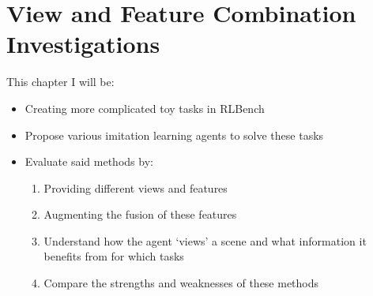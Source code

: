 \chapter{View and Feature Combination Investigations}\label{ch:view-comb}
This chapter I will be:
\begin{itemize}
  \item Creating more complicated toy tasks in RLBench
  \item Propose various imitation learning agents to solve these tasks
  \item Evaluate said methods by:
  \begin{enumerate}
    \item Providing different views and features
    \item Augmenting the fusion of these features
    \item Understand how the agent `views' a scene and what information it benefits from for which tasks
    \item Compare the strengths and weaknesses of these methods
  \end{enumerate}
\end{itemize}









